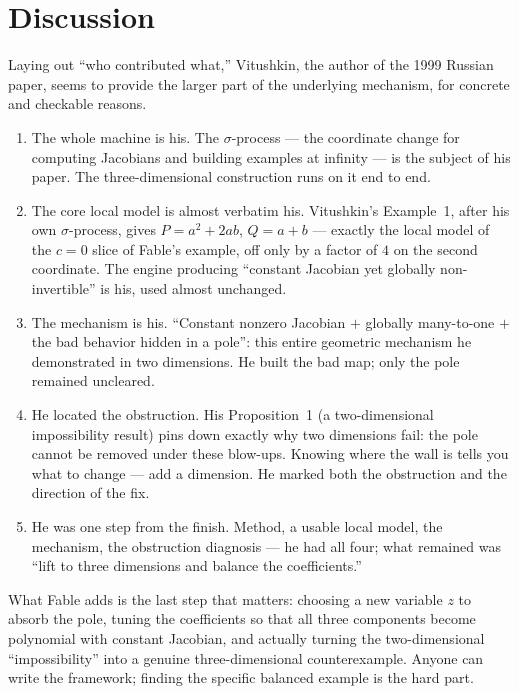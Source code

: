 \documentclass[11pt]{article}
\theoremstyle{plain}
\theoremstyle{definition}
\begin{document}
\section*{Discussion}
Laying out ``who contributed what,'' Vitushkin, the author of the 1999
Russian paper, seems to provide the larger part of the underlying mechanism,
for concrete and checkable reasons.
\begin{enumerate}[label=\textbf{\arabic*.},nosep,leftmargin=*]
  \item The whole machine is his. The $\sigma$-process --- the
        coordinate change for computing Jacobians and building examples at
        infinity --- is the subject of his paper. The three-dimensional
        construction runs on it end to end.
  \item The core local model is almost verbatim his. Vitushkin's
        Example~1, after his own $\sigma$-process, gives $P=a^2+2ab$,
        $Q=a+b$ --- exactly the local model of the $c=0$ slice of Fable's
        example, off only by a factor of $4$ on the second coordinate. The
        engine producing ``constant Jacobian yet globally non-invertible'' is
        his, used almost unchanged.
  \item The mechanism is his. ``Constant nonzero Jacobian $+$
        globally many-to-one $+$ the bad behavior hidden in a pole'': this
        entire geometric mechanism he demonstrated in two dimensions. He built
        the bad map; only the pole remained uncleared.
  \item He located the obstruction. His Proposition~1 (a
        two-dimensional impossibility result) pins down exactly why two
        dimensions fail: the pole cannot be removed under these blow-ups.
        Knowing where the wall is tells you what to change --- add a
        dimension. He marked both the obstruction and the direction of the fix.
  \item He was one step from the finish. Method, a usable local
        model, the mechanism, the obstruction diagnosis --- he had all four;
        what remained was ``lift to three dimensions and balance the
        coefficients.''
\end{enumerate}

What Fable adds is the last step that matters: choosing a new variable $z$ to
absorb the pole, tuning the coefficients so that all three components become
polynomial with constant Jacobian, and actually turning the two-dimensional
``impossibility'' into a genuine three-dimensional counterexample. Anyone can
write the framework; finding the specific balanced example is the hard part.
\end{document}
